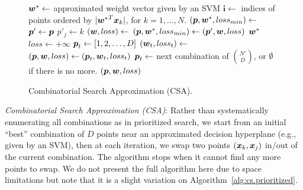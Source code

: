 \MYCOMMENT

\begin{figure}[tp!]
\vspace{-3mm}
\caption{
Combinatorial Search Approximation (CSA).\hfill \; \\
}
\label{alg:cs.approximation}
{\footnotesize 
\begin{algorithmic}[1]
 
\STATE $\boldsymbol{w}^* \gets$ approximated weight vector given by an SVM
\STATE $\boldsymbol{i} \gets$ indices of points ordered by $|{\boldsymbol{w}^*}^T\boldsymbol{x}_k|$, for $k=1, \dots, N$.
\STATE $(\boldsymbol{p}, \boldsymbol{w}^*, loss_{min}) \gets$ 
\Loop
            \STATE $\boldsymbol{p}' \gets \boldsymbol{p}$
            \STATE $p'_j \gets k$
            \STATE $(\boldsymbol{w}, loss) \gets$ 
               \STATE $(\boldsymbol{p}, \boldsymbol{w}^*, loss_{min}) \gets (\boldsymbol{p}', \boldsymbol{w}, loss)$
            \EndIf
         \EndFor
      \EndIf
   \EndFor
   \STATE \Return $\boldsymbol{w}^*$
 \EndLoop
\STATEx
{} 
   \STATE $loss \gets +\infty$
   \STATE $\boldsymbol{p}_t \gets [1,2,\dots,D]$
      \STATE $(\boldsymbol{w}_t, loss_t) \gets$ 
         \STATE $(\boldsymbol{p}, \boldsymbol{w}, loss) \gets (\boldsymbol{p}_t, \boldsymbol{w}_t, loss_t)$
      \EndIf
      \STATE $\boldsymbol{p}_t \gets $ next combination of ${N' \choose D}$, or $\emptyset$ if there is no more.
   \EndWhile
   \STATE \Return $(\boldsymbol{p}, \boldsymbol{w}, loss)$
\EndFunction
\STATEx
\EndFunction
\end{algorithmic}}
\vspace{-4mm}
\end{figure}

\ENDMYCOMMENT

\noindent \emph{Combinatorial Search Approximation (CSA)}: Rather than
systematically enumerating all combinations as in prioritized search,
we start from an initial ``best'' combination of $D$ points near an
approximated decision hyperplane (e.g., given by an SVM), then at each
iteration, we swap two points $(\boldsymbol{x}_k, \boldsymbol{x}_j)$ in/out of the
current combination. The algorithm stops when it cannot find any more
points to swap.  We do not present the full algorithm here due to
space limitations but note that it is a slight variation on Algorithm~\ref{alg:cs.prioritized}.
